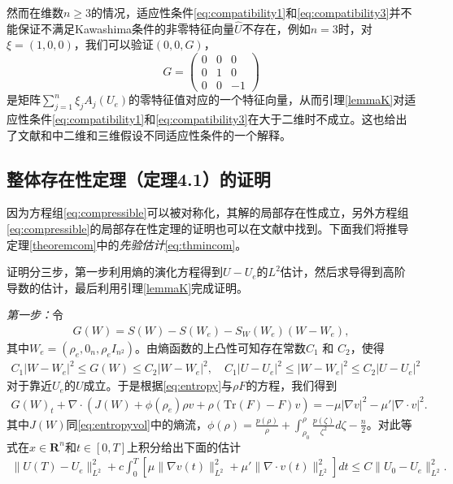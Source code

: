 \begin{remark}
然而在维数$n \ge 3$的情况，适应性条件\eqref{eq:compatibility1}和\eqref{eq:compatibility3}并不能保证不满足Kawashima条件的非零特征向量$\hat{U}$不存在，例如$n=3$时，对$\xi = (1,0,0)$，我们可以验证$(0,0, G)$，
 $$
 G = \left( \begin{array}{ccc}
 0 & 0 & 0 \\
 0 & 1 & 0 \\
 0 & 0 & -1 \end{array} \right)
 $$
是矩阵$ \sum_{j=1}^n \xi_j A_j(U_e)$的零特征值对应的一个特征向量，从而引理\ref{lemmaK}对适应性条件\eqref{eq:compatibility1}和\eqref{eq:compatibility3}在大于二维时不成立。这也给出了文献\cite{lin2005hydrodynamics}和\cite{liu2008global}中二维和三维假设不同适应性条件的一个解释。
\end{remark}

\subsection{整体存在性定理（定理4.1）的证明}
因为方程组\eqref{eq:compressible}可以被对称化，其解的局部存在性成立\cite{kawashima1984systems}，另外方程组\eqref{eq:compressible}的局部存在性定理的证明也可以在文献\cite{lin2005hydrodynamics,lei2008global,hu2013global}中找到。下面我们将推导定理\ref{theoremcom}中的\emph{先验估计}\eqref{eq:thmincom}。

证明分三步，第一步利用熵的演化方程得到$U-U_e$的$L^2$估计，然后求导得到高阶导数的估计，最后利用引理\ref{lemmaK}完成证明。

\emph{第一步：}令
\begin{eqnarray*}
  G(W) = S(W) - S(W_e) - S_W(W_e) (W-W_e),
\end{eqnarray*}
其中$W_e = (\rho_e, 0_n, \rho_e I_{n^2})$。由熵函数的上凸性可知存在常数$C_1$ 和 $C_2$，使得
\begin{eqnarray*}
  C_1 |W-W_e|^2 \le G(W) \le C_2 |W-W_e|^2, \quad C_1 |U-U_e|^2 \le |W-W_e|^2 \le C_2 |U-U_e|^2
\end{eqnarray*}
对于靠近$U_e$的$U$成立。于是根据\eqref{eq:entropy}与$\rho F$的方程，我们得到
\begin{eqnarray*}
  G(W)_t + \nabla \cdot (J(W) + \phi(\rho_e) \rho  v  + \rho (\mbox{Tr}(F) - F) v ) = -\mu |\nabla  v |^2 - \mu' |\nabla \cdot  v |^2.
\end{eqnarray*}
其中$J(W)$同\eqref{eq:entropyvol}中的熵流，$\phi(\rho) = \frac{p(\rho)}{\rho} + \int_{\rho_0}^{\rho}\frac{p(\zeta)}{\zeta^2}d\zeta - \frac{n}{2}$。对此等式在$x\in\mathbf{R}^n$和$t\in[0, T]$上积分给出下面的估计
\begin{eqnarray}\label{eq:EnergyESTcom}
  \|U(T) - U_e\|_{L^2}^2 + c \int_0^T[ \mu \|\nabla v (t)\|_{L^2}^2 +  \mu' \|\nabla \cdot  v (t)\|_{L^2}^2] dt
  \le C\|U_0-U_e\|_{L^2}^2 .
\end{eqnarray}

